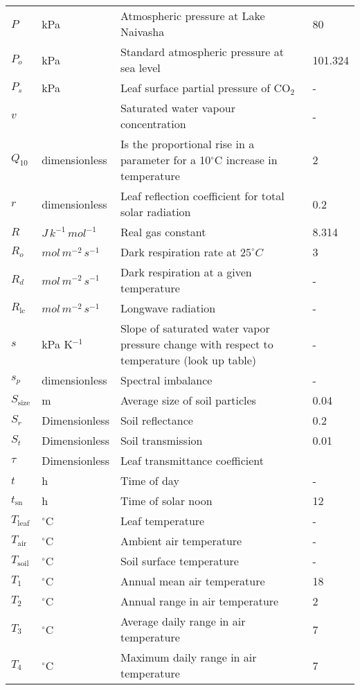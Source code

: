 \documentclass[12pt,fullpage]{report}
\begin{document}
\begin{center}
\begin{longtable}{l l p{3in} p{0.5in}}
$P$	&	kPa	&	Atmospheric pressure at Lake Naivasha	&	80	\\
$P_o$	&	kPa	&	Standard atmospheric pressure at sea level	&	101.324	\\
$P_s$	&	kPa	&	Leaf surface partial pressure of CO$_2$ 	&	-	\\
$v$	&		&	Saturated water vapour concentration 	&	-	\\
$Q_{10}$	&	dimensionless	&	Is the proportional rise in a parameter for a 10$^\circ$C increase in temperature	&	2	\\
$r$	&	dimensionless	&	Leaf reflection coefficient for total solar radiation	&	0.2	\\
$R$	&	$J\, k^{-1}\, mol^{-1}$ 	&	Real gas constant	&	8.314	\\
$R_o$	&	$mol\, m^{-2}\, s^{-1}$ 	&	Dark respiration rate at $25^\circ C$	&	3	\\
$R_d$	&	$mol\, m^{-2}\, s^{-1}$ 	&	Dark respiration at a given temperature	&	-	\\
$R_{\text{lc}}$	&	$mol\, m^{-2}\, s^{-1}$ 	&	Longwave radiation	&	-	\\
$s$	&	kPa K$^{-1}$	&	Slope of saturated water vapor pressure change with respect to temperature (look up table)	&	-	\\
$s_p$	&	dimensionless	&	Spectral imbalance	&	-	\\
$S_{\text{size}}$	&	m	&	Average size of soil particles	&	0.04	\\
$S_r$	&	Dimensionless	&	Soil reflectance	&	0.2	\\
$S_t$	&	Dimensionless 	&	Soil transmission	&	0.01	\\
$\tau$	&	Dimensionless 	&	Leaf transmittance coefficient	&		\\
$t$	&	h	&	Time of day	&	-	\\
$t_{\text{sn}}$	&	h	&	Time of solar noon	&	12	\\
$T_{\text{leaf}}$	&	$^\circ$C	&	Leaf temperature	&	-	\\
$T_{\text{air}}$	&	$^\circ$C	&	Ambient air temperature	&	-	\\
$T_{\text{soil}}$	&	$^\circ$C	&	Soil surface temperature	&	-	\\
$T_1$	&	$^\circ$C	&	Annual mean air temperature	&	18	\\
$T_2$	&	$^\circ$C	&	Annual range in air temperature	&	2	\\
$T_3$	&	$^\circ$C	&	Average daily range in air temperature	&	7	\\
$T_4$	&	$^\circ$C	&	Maximum daily range in air temperature	&	7	\\

\end{longtable}
\end{center}
\end{document}
